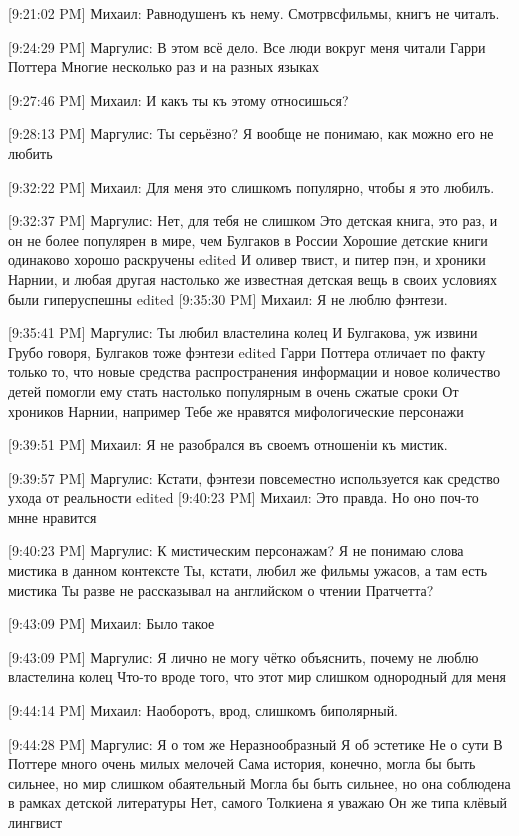 \documentclass{article}
\newcommand{\yat}{{\fontencoding{X2}\selectfont\cyryat}} %
\begin{document}
[9:21:02 PM] Михаил:
Равнодушенъ къ нему. Смотр вс\yat фильмы, книгъ не читалъ.

[9:24:29 PM] Маргулис:
В этом всё дело.
 Все люди вокруг меня читали Гарри Поттера
 Многие несколько раз и на разных языках

[9:27:46 PM] Михаил:
И какъ ты къ этому относишься?

[9:28:13 PM] Маргулис:
Ты серьёзно? Я вообще не понимаю, как можно его не любить

[9:32:22 PM] Михаил:
Для меня это слишкомъ популярно, чтобы я это любилъ.

[9:32:37 PM] Маргулис:
Нет, для тебя не слишком
 Это детская книга, это раз, и он не более популярен в мире, чем Булгаков в России
 Хорошие детские книги одинаково хорошо раскручены
edited 
И оливер твист, и питер пэн, и хроники Нарнии, и любая другая настолько же известная детская вещь в своих условиях были гиперуспешны
edited 
[9:35:30 PM] Михаил:
Я не люблю фэнтези.

[9:35:41 PM] Маргулис:
Ты любил властелина колец
 И Булгакова, уж извини
 Грубо говоря, Булгаков тоже фэнтези
edited 
Гарри Поттера отличает по факту только то, что новые средства распространения информации и новое количество детей помогли ему стать настолько популярным в очень сжатые сроки
 От хроников Нарнии, например
 Тебе же нравятся мифологические персонажи

[9:39:51 PM] Михаил:
Я не разобрался въ своемъ отношеніи къ мистик\yat.

[9:39:57 PM] Маргулис:
Кстати, фэнтези повсеместно используется как средство ухода от реальности
edited 
[9:40:23 PM] Михаил:
Это правда. Но оно поч-то мн\yat не нравится

[9:40:23 PM] Маргулис:
К мистическим персонажам?
 Я не понимаю слова мистика в данном контексте
 Ты, кстати, любил же фильмы ужасов, а там есть мистика
 Ты разве не рассказывал на английском о чтении Пратчетта?

[9:43:09 PM] Михаил:
Было такое

[9:43:09 PM] Маргулис:
Я лично не могу чётко объяснить, почему не люблю властелина колец
 Что-то вроде того, что этот мир слишком однородный для меня

[9:44:14 PM] Михаил:
Наоборотъ, врод\yat, слишкомъ биполярный.

[9:44:28 PM] Маргулис:
Я о том же
 Неразнообразный
 Я об эстетике
 Не о сути
 В Поттере много очень милых мелочей
 Сама история, конечно, могла бы быть сильнее, но мир слишком обаятельный
 Могла бы быть сильнее, но она соблюдена в рамках детской литературы
 Нет, самого Толкиена я уважаю
 Он же типа клёвый лингвист
\end{document}
